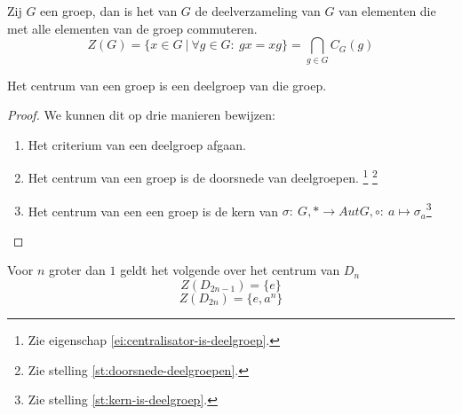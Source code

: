 \documentclass[main.tex]{subfiles}
\begin{document}
\begin{de}
  \label{de:centrum}
  Zij $G$ een groep, dan is het  van $G$ de deelverzameling van $G$ van elementen die met alle elementen van de groep commuteren.
  \[ Z(G) = \{ x \in G\ |\ \forall g \in G:\ gx = xg\} = \bigcap_{g \in G}C_{G}(g) \]
\end{de}

\begin{ei}
  \label{ei:centrum-is-deelgroep}
  Het centrum van een groep is een deelgroep van die groep.

  \begin{proof}
    We kunnen dit op drie manieren bewijzen:
    \begin{enumerate}
    \item Het criterium van een deelgroep afgaan.
    \item Het centrum van een groep is de doorsnede van deelgroepen. \footnote{Zie eigenschap \ref{ei:centralisator-is-deelgroep}.}
\footnote{Zie stelling \ref{st:doorsnede-deelgroepen}.}
    \item Het centrum van een een groep is de kern van $\sigma:\ G,* \rightarrow Aut G,\circ:\ a \mapsto \sigma_{a}$\footnote{Zie stelling \ref{st:kern-is-deelgroep}.}
    \end{enumerate}
  \end{proof}
\end{ei}

\begin{st}
  Voor $n$ groter dan $1$ geldt het volgende over het centrum van $D_{n}$
  \[ Z(D_{2n-1}) = \{e\} \]
  \[ Z(D_{2n}) = \{e,a^{n}\} \]
  
\end{st}
\end{document}
